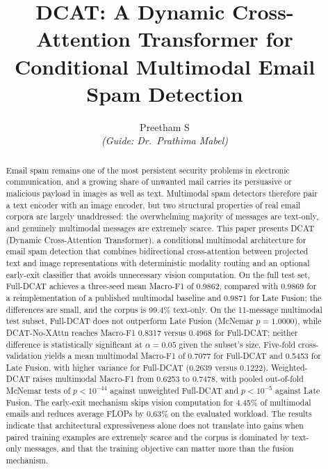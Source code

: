\documentclass[10pt,twoside]{article}
\title{\bfseries DCAT: A Dynamic Cross-Attention Transformer for Conditional Multimodal Email Spam Detection}
\author{Preetham S\\{\normalsize\itshape (Guide: Dr.\ Prathima Mabel)}}
\date{}
\begin{document}
\maketitle
\thispagestyle{fancy}

\begin{abstract}
\noindent
Email spam remains one of the most persistent security problems in electronic communication, and a growing share of unwanted mail carries its persuasive or malicious payload in images as well as text. Multimodal spam detectors therefore pair a text encoder with an image encoder, but two structural properties of real email corpora are largely unaddressed: the overwhelming majority of messages are text-only, and genuinely multimodal messages are extremely scarce. This paper presents DCAT (Dynamic Cross-Attention Transformer), a conditional multimodal architecture for email spam detection that combines bidirectional cross-attention between projected text and image representations with deterministic modality routing and an optional early-exit classifier that avoids unnecessary vision computation. On the full test set, Full-DCAT achieves a three-seed mean Macro-F1 of 0.9862, compared with 0.9869 for a reimplementation of a published multimodal baseline and 0.9871 for Late Fusion; the differences are small, and the corpus is 99.4\% text-only. On the 11-message multimodal test subset, Full-DCAT does not outperform Late Fusion (McNemar $p = 1.0000$), while DCAT-No-XAttn reaches Macro-F1 0.8317 versus 0.4968 for Full-DCAT; neither difference is statistically significant at $\alpha = 0.05$ given the subset's size. Five-fold cross-validation yields a mean multimodal Macro-F1 of 0.7077 for Full-DCAT and 0.5453 for Late Fusion, with higher variance for Full-DCAT (0.2639 versus 0.1222). Weighted-DCAT raises multimodal Macro-F1 from 0.6253 to 0.7478, with pooled out-of-fold McNemar tests of $p < 10^{-44}$ against unweighted Full-DCAT and $p < 10^{-5}$ against Late Fusion. The early-exit mechanism skips vision computation for 4.45\% of multimodal emails and reduces average FLOPs by 0.63\% on the evaluated workload. The results indicate that architectural expressiveness alone does not translate into gains when paired training examples are extremely scarce and the corpus is dominated by text-only messages, and that the training objective can matter more than the fusion mechanism.
\end{abstract}

\vspace{2pt}
\end{document}
